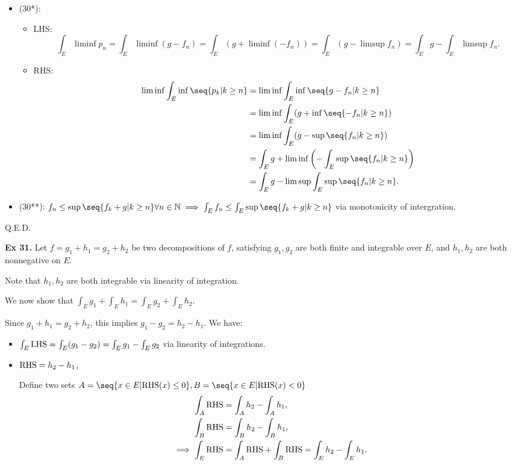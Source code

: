 \begin{enumerate}[label=(\roman*)]
    \begin{itemize}
        \item (30*):
        \begin{itemize}
            \item LHS: \[\int_E \liminf p_n = \int_E \liminf (g - f_n) = \int_E (g + \liminf (-f_n)) = \int_E (g - \limsup f_n) = \int_E g - \int_E \limsup f_n.\]
            \item RHS: \begin{align*}
                \liminf \int_E \inf\seq{p_k| k \geq n} &= \liminf \int_E \inf\seq{g - f_n| k \geq n}
            \\&= \liminf \int_E (g + \inf\seq{-f_n| k \geq n}) \\&= \liminf \int_E (g - \sup\seq{f_n| k \geq n})
            \\&= \int_E g + \liminf \left(-\int_E \sup\seq{f_n| k \geq n}\right) \\&= \int_E g - \limsup \int_E \sup\seq{f_n| k \geq n}.
            \end{align*}
        \end{itemize}
        \item (30**): $f_n \leq \sup\seq{f_k + g | k \geq n}\forall n\in\N \implies \int_E f_n \leq \int_E \sup\seq{f_k + g | k \geq n}$ via monotonicity of intergration.
    \end{itemize}
    
    
\end{enumerate}

Q.E.D.


\noindent {} \textbf{Ex 31.} \label{ex:4_31}
Let $f = g_1 + h_1 = g_2 + h_2$ be two decompositions of $f$,
satisfying $g_1,g_2$ are both finite and integrable over $E$,
and $h_1,h_2$ are both nonnegative on $E$.

Note that $h_1,h_2$ are both integrable via linearity of integration.

We now show that $\int_E g_1 + \int_E h_1 = \int_E g_2 + \int_E h_2$.

Since $g_1 + h_1 = g_2 + h_2$, this implies $g_1 - g_2 = h_2 - h_1$. We have:
\begin{itemize}
    \item $\int_E \text{LHS} = \int_E (g_1 - g_2) = \int_E g_1 - \int_E g_2$ via linearity of integrations.
    \item $\text{RHS} = h_2 - h_1$, 
    
    Define two sets $A = \seq{x\in E | \RHS(x) \leq 0}, B = \seq{x\in E | \RHS(x) < 0}$
    \begin{align*}
        \int_A \text{RHS} &= \int_A h_2 - \int_A h_1, \\
        \int_B \text{RHS} &= \int_B h_2 - \int_B h_1, \\
        \implies \int_E \text{RHS} &= \int_A \text{RHS} + \int_B \text{RHS} = \int_E h_2 - \int_E h_1.
    \end{align*}
\end{itemize}


